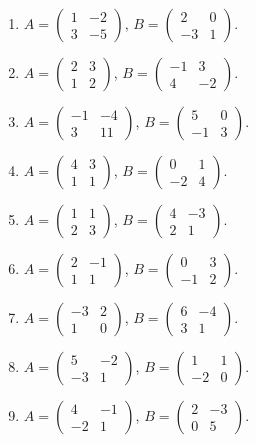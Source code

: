 \begin{enumerate}[label=\arabic*.,  leftmargin=*]
\item $A=\begin{pmatrix}1&-2\\3&-5\end{pmatrix}$, $B=\begin{pmatrix}2&0\\-3&1\end{pmatrix}$.
\item $A=\begin{pmatrix}2&3\\1&2\end{pmatrix}$, $B=\begin{pmatrix}-1&3\\4&-2\end{pmatrix}$.
\item $A=\begin{pmatrix}-1&-4\\3&11\end{pmatrix}$, $B=\begin{pmatrix}5&0\\-1&3\end{pmatrix}$.
\item $A=\begin{pmatrix}4&3\\1&1\end{pmatrix}$, $B=\begin{pmatrix}0&1\\-2&4\end{pmatrix}$.
\item $A=\begin{pmatrix}1&1\\2&3\end{pmatrix}$, $B=\begin{pmatrix}4&-3\\2&1\end{pmatrix}$.
\item $A=\begin{pmatrix}2&-1\\1&1\end{pmatrix}$, $B=\begin{pmatrix}0&3\\-1&2\end{pmatrix}$.
\item $A=\begin{pmatrix}-3&2\\1&0\end{pmatrix}$, $B=\begin{pmatrix}6&-4\\3&1\end{pmatrix}$.
\item $A=\begin{pmatrix}5&-2\\-3&1\end{pmatrix}$, $B=\begin{pmatrix}1&1\\-2&0\end{pmatrix}$.
\item $A=\begin{pmatrix}4&-1\\-2&1\end{pmatrix}$, $B=\begin{pmatrix}2&-3\\0&5\end{pmatrix}$.
\end{enumerate}
